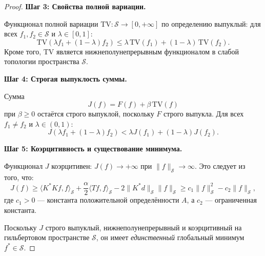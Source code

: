 \documentclass[sn-mathphys-num]{bst/sn-jnl}
\theoremstyle{thmstylethree}
\theoremstyle{thmstyletwo}
\theoremstyle{thmstyleone}
\begin{document}
\begin{proof}
\textbf{Шаг 3: Свойства полной вариации.}

Функционал полной вариации $\mathrm{TV}:\mathcal{S}\to[0,+\infty]$ по определению выпуклый: для всех $f_1, f_2 \in \mathcal{S}$ и $\lambda \in [0,1]$:
\begin{equation}
    \mathrm{TV}(\lambda f_1 + (1-\lambda)f_2) \leq \lambda \,\mathrm{TV}(f_1) + (1-\lambda)\,\mathrm{TV}(f_2).
\end{equation}
Кроме того, $\mathrm{TV}$ является нижнеполунепрерывным функционалом в слабой топологии пространства $\mathcal{S}$.

\textbf{Шаг 4: Строгая выпуклость суммы.}

Сумма 
\begin{equation}
    J(f) = F(f) + \beta \,\mathrm{TV}(f)
\end{equation}
при $\beta \geq 0$ остаётся строго выпуклой, поскольку $F$ строго выпукла. Для всех $f_1 \neq f_2$ и $\lambda \in (0,1)$:
\begin{equation}
    J(\lambda f_1 + (1-\lambda)f_2) < \lambda J(f_1) + (1-\lambda)J(f_2).
\end{equation}


\textbf{Шаг 5: Коэрцитивность и существование минимума.}

Функционал $J$ коэрцитивен: $J(f) \to +\infty$ при $\|f\|_{\mathcal{S}} \to \infty$. Это следует из того, что:
\begin{equation}
    J(f) \geq \langle K^*K f, f\rangle_{\mathcal{S}} + \frac{\alpha}{2}\langle T f, f\rangle_{\mathcal{S}} - 
    2\|K^*d\|_{\mathcal{S}} \|f\|_{\mathcal{S}} \geq c_1 \|f\|_{\mathcal{S}}^2 - c_2 \|f\|_{\mathcal{S}},
\end{equation}
где $c_1 > 0$ — константа положительной определённости $A$, а $c_2$ — ограниченная константа.

Поскольку $J$ строго выпуклый, нижнеполунепрерывный и коэрцитивный на гильбертовом пространстве $\mathcal{S}$, 
он имеет \textit{единственный} глобальный минимум $f^* \in \mathcal{S}$.
\end{proof}
\end{document}
